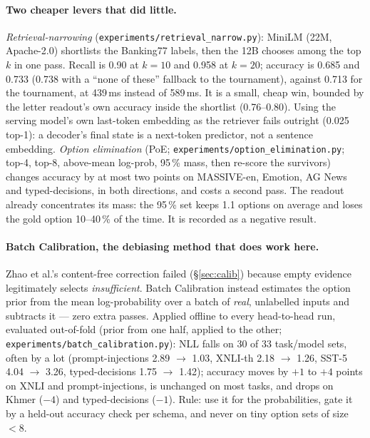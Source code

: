 \documentclass[11pt,a4paper]{article}
\newcommand{\code}[1]{\texttt{#1}}
\begin{document}
\paragraph{Two cheaper levers that did little.} \emph{Retrieval-narrowing} (\code{experiments/retrieval\_narrow.py}): MiniLM (22M, Apache-2.0) shortlists the Banking77 labels, then the 12B chooses among the top $k$ in one pass. Recall is 0.90 at $k{=}10$ and 0.958 at $k{=}20$; accuracy is 0.685 and 0.733 (0.738 with a ``none of these'' fallback to the tournament), against 0.713 for the tournament, at 439\,ms instead of 589\,ms. It is a small, cheap win, bounded by the letter readout's own accuracy inside the shortlist (0.76--0.80). Using the serving model's own last-token embedding as the retriever fails outright (0.025 top-1): a decoder's final state is a next-token predictor, not a sentence embedding. \emph{Option elimination} (PoE; \code{experiments/option\_elimination.py}; top-4, top-8, above-mean log-prob, 95\,\% mass, then re-score the survivors) changes accuracy by at most two points on MASSIVE-en, Emotion, AG News and typed-decisions, in both directions, and costs a second pass. The readout already concentrates its mass: the 95\,\% set keeps 1.1 options on average and loses the gold option 10--40\,\% of the time. It is recorded as a negative result.

\paragraph{Batch Calibration, the debiasing method that does work here.} Zhao et al.'s content-free correction failed (\S\ref{sec:calib}) because empty evidence legitimately selects \emph{insufficient}. Batch Calibration \cite{bc} instead estimates the option prior from the mean log-probability over a batch of \emph{real}, unlabelled inputs and subtracts it --- zero extra passes. Applied offline to every head-to-head run, evaluated out-of-fold (prior from one half, applied to the other; \code{experiments/batch\_calibration.py}): NLL falls on 30 of 33 task/model sets, often by a lot (prompt-injections 2.89 $\to$ 1.03, XNLI-th 2.18 $\to$ 1.26, SST-5 4.04 $\to$ 3.26, typed-decisions 1.75 $\to$ 1.42); accuracy moves by $+1$ to $+4$ points on XNLI and prompt-injections, is unchanged on most tasks, and drops on Khmer ($-4$) and typed-decisions ($-1$). Rule: use it for the probabilities, gate it by a held-out accuracy check per schema, and never on tiny option sets of size $<8$.
\end{document}

